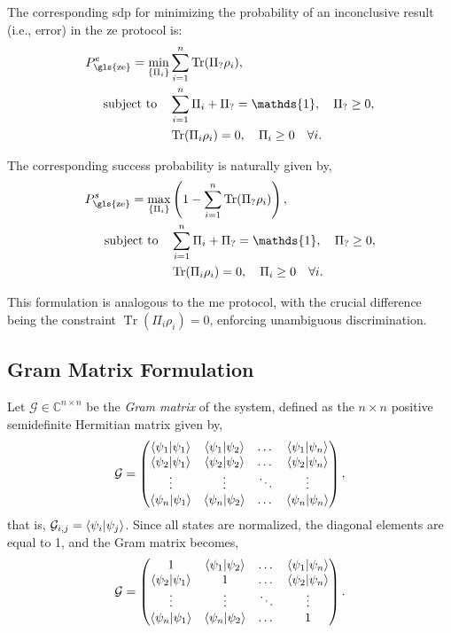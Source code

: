 \documentclass[12pt,letterpaper]{article}
\DeclareMathOperator{\tr}{Tr}
\begin{document}
\begin{multicols}{2}
The corresponding \gls{sdp} for minimizing the probability of an inconclusive result (i.e., error) in the \gls{ze} protocol is:
\begin{align*}
	P_{\text{\gls{ze}}}^e = \min_{\left\{\Pi_i\right\}} &\sum_{i=1}^n \tr(\Pi_? \rho_i),\\
	\text{subject to} \quad & \sum_{i=1}^n \Pi_i + \Pi_? = \mathds{1}, \quad \Pi_? \geq 0,\\
	& \tr(\Pi_i \rho_i) = 0, \quad \Pi_i \geq 0 \quad \forall i.
\end{align*}

The corresponding success probability is naturally given by,
\begin{align*}
	P_{\text{\gls{ze}}}^s = \max_{\left\{\Pi_i\right\}} &\left(1 - \sum_{i=1}^n \tr(\Pi_? \rho_i)\right),\\
	\text{subject to} \quad & \sum_{i=1}^n \Pi_i + \Pi_? = \mathds{1}, \quad \Pi_? \geq 0,\\
	& \tr(\Pi_i \rho_i) = 0, \quad \Pi_i \geq 0 \quad \forall i.
\end{align*}

This formulation is analogous to the \gls{me} protocol, with the crucial difference being the constraint $\tr(\Pi_i \rho_i) = 0$, enforcing unambiguous discrimination.

\subsection{Gram Matrix Formulation}\label{sectionGramMatrixFormulation}

Let $\mathcal{G} \in \mathbb{C}^{n \times n}$ be the \emph{Gram matrix} of the system, defined as the $n \times n$ positive semidefinite Hermitian matrix given by,
\begin{equation*}
	\mathcal{G} =
	\begin{pmatrix}
		\braket{\psi_1|\psi_1} & \braket{\psi_1|\psi_2} & \dots & \braket{\psi_1|\psi_n} \\
		\braket{\psi_2|\psi_1} & \braket{\psi_2|\psi_2} & \dots & \braket{\psi_2|\psi_n} \\
		\vdots & \vdots & \ddots & \vdots \\
		\braket{\psi_n|\psi_1} & \braket{\psi_n|\psi_2} & \dots & \braket{\psi_n|\psi_n}
	\end{pmatrix},
\end{equation*}
that is, $\mathcal{G}_{i,j} = \braket{\psi_i|\psi_j}$. Since all states are normalized, the diagonal elements are equal to 1, and the Gram matrix becomes,
\begin{equation*}
	\mathcal{G} =
	\begin{pmatrix}
		1 & \braket{\psi_1|\psi_2} & \dots & \braket{\psi_1|\psi_n} \\
		\braket{\psi_2|\psi_1} & 1 & \dots & \braket{\psi_2|\psi_n} \\
		\vdots & \vdots & \ddots & \vdots \\
		\braket{\psi_n|\psi_1} & \braket{\psi_n|\psi_2} & \dots & 1
	\end{pmatrix}.
\end{equation*}


\end{multicols}
\end{document}
